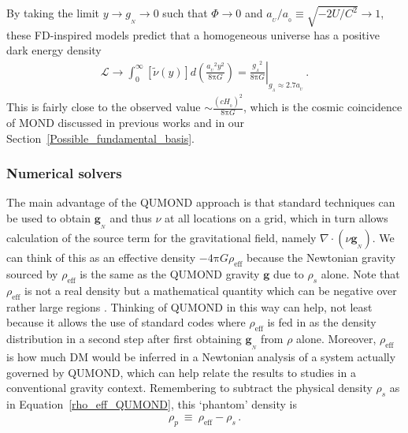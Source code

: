 \documentclass[fleqn,usenatbib,useAMS,onecolumn]{mnras} %
\begin{document}
By taking the limit $y \to g_{_N} \to 0$ such that $\Phi \to 0$ and $a_{_U}/a_{_0} \equiv \sqrt{-2U/C^2} \to 1$, these FD-inspired models predict that a homogeneous universe has a positive dark energy density 
\begin{eqnarray}
    \mathcal{L} \to \int^\infty_{0} \left[ \widetilde{\nu}\left( y \right)  \right] d \left( \frac{{a_{_U}}^2 y^2}{8\mathrm{\pi} G} \right) = \left.\frac{{g_{_\Lambda}}^2}{8\mathrm{\pi}G}\right|_{g_{_\Lambda} \approx 2.7 a_{_U}} \, .
\end{eqnarray}
This is fairly close to the observed value $\sim \frac{\left(c H_{_0}\right)^2}{8\mathrm{\pi}G}$, which is the cosmic coincidence of MOND discussed in previous works \citep{Zhao_2007, Li_2009} and in our Section~\ref{Possible_fundamental_basis}.



\subsubsection{Numerical solvers}
\label{Numerical_solvers}

The main advantage of the QUMOND approach is that standard techniques can be used to obtain $\bm{g}_{_N}$ and thus $\nu$ at all locations on a grid, which in turn allows calculation of the source term for the gravitational field, namely $\nabla \cdot \left( \nu \bm{g}_{_N} \right)$. We can think of this as an effective density $-4 \mathrm{\pi} G \rho_{\text{eff}}$ because the Newtonian gravity sourced by $\rho_{\text{eff}}$ is the same as the QUMOND gravity $\bm{g}$ due to $\rho_s$ alone. Note that $\rho_{\text{eff}}$ is not a real density but a mathematical quantity which can be negative over rather large regions \citep{Banik_2018_EFE, Oria_2021}. Thinking of QUMOND in this way can help, not least because it allows the use of standard codes where $\rho_{\text{eff}}$ is fed in as the density distribution in a second step after first obtaining $\bm{g}_{_N}$ from $\rho$ alone. Moreover, $\rho_{\text{eff}}$ is how much DM would be inferred in a Newtonian analysis of a system actually governed by QUMOND, which can help relate the results to studies in a conventional gravity context. Remembering to subtract the physical density $\rho_s$ as in Equation~\ref{rho_eff_QUMOND}, this `phantom' density is
\begin{eqnarray}
	\rho_p ~\equiv~ \rho_{\text{eff}} - \rho_s \, .
\end{eqnarray}
\end{document}
